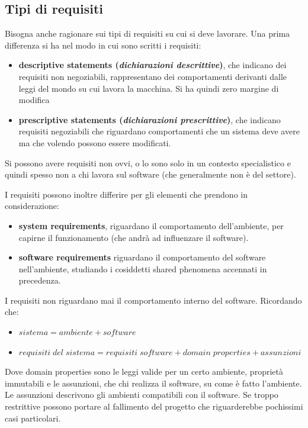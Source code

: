 \subsection{Tipi di requisiti}
Bisogna anche ragionare sui tipi di requisiti su cui si deve lavorare. Una prima differenza si ha nel modo in cui sono scritti i requisiti:
\begin{itemize} 
    \item \textbf{descriptive statements (\textit{dichiarazioni descrittive})}, che indicano dei requisiti non negoziabili, rappresentano dei comportamenti derivanti dalle leggi del mondo su cui lavora la macchina. Si ha quindi zero margine di modifica 
    \item \textbf{prescriptive statements (\textit{dichiarazioni prescrittive})}, che indicano requisiti negoziabili che riguardano comportamenti che un sistema deve avere ma che volendo possono essere modificati. 
\end{itemize}
Si possono avere requisiti non ovvi, o lo sono solo in un contesto specialistico e quindi spesso non a chi lavora sul software (che generalmente non è del settore).

I requisiti possono inoltre differire per gli elementi che prendono in considerazione:
\begin{itemize}
  \item \textbf{system requirements},  riguardano il comportamento dell’ambiente, per capirne il funzionamento (che andrà ad influenzare il software).
  \item \textbf{software requirements}  riguardano il comportamento del software nell’ambiente, studiando i cosiddetti shared phenomena accennati in precedenza.
\end{itemize}
I requisiti non riguardano mai il comportamento interno del software. Ricordando che: 
\begin{itemize}
    \item $sistema = ambiente + software$
    \item $requisiti \; del \; sistema = requisiti \; software + domain \; properties + assunzioni$
\end{itemize}\label{riferimento}
Dove domain properties sono le leggi valide per un certo ambiente, proprietà immutabili e le assunzioni, che chi realizza il software, su come è fatto l’ambiente. Le assunzioni descrivono gli ambienti compatibili con il software. Se troppo restrittive possono portare al fallimento del progetto che riguarderebbe pochissimi casi particolari.\\

